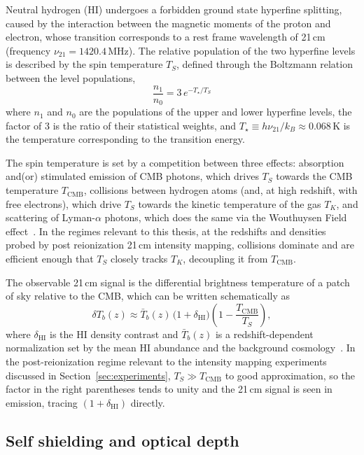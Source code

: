 Neutral hydrogen (HI) undergoes a forbidden ground state hyperfine splitting, caused by the interaction between the magnetic moments of the proton and electron, whose transition corresponds to a rest frame wavelength of 21\,cm (frequency $\nu_{21}=1420.4$\,MHz). The relative population of the two hyperfine levels is described by the spin temperature $T_S$, defined through the Boltzmann relation between the level populations,
\begin{equation}
    \frac{n_1}{n_0} = 3\,e^{-T_\star/T_S}
\end{equation}
where $n_1$ and $n_0$ are the populations of the upper and lower hyperfine levels, the factor of 3 is the ratio of their statistical weights, and $T_\star\equiv h\nu_{21}/k_B\approx0.068$\,K is the temperature corresponding to the transition energy.

The spin temperature is set by a competition between three effects: absorption and(or) stimulated emission of CMB photons, which drives $T_S$ towards the CMB temperature $T_\text{CMB}$, collisions between hydrogen atoms (and, at high redshift, with free electrons), which drive $T_S$ towards the kinetic temperature of the gas $T_K$, and scattering of Lyman-$\alpha$ photons, which does the same via the Wouthuysen Field effect~\citep{Furlanetto:2006}. In the regimes relevant to this thesis, at the redshifts and densities probed by post reionization 21\,cm intensity mapping, collisions dominate and are efficient enough that $T_S$ closely tracks $T_K$, decoupling it from $T_\text{CMB}$.

The observable 21\,cm signal is the differential brightness temperature of a patch of sky relative to the CMB, which can be written schematically as
\begin{equation}
    \delta T_b(z) \approx \bar{T}_b(z)\,\big(1+\delta_\text{HI}\big)\left(1 - \frac{T_\text{CMB}}{T_S}\right),
\end{equation}
where $\delta_\text{HI}$ is the HI density contrast and $\bar{T}_b(z)$ is a redshift-dependent normalization set by the mean HI abundance and the background cosmology~\citep{Furlanetto:2006}. In the post-reionization regime relevant to the intensity mapping experiments discussed in Section~\ref{sec:experiments}, $T_S\gg T_\text{CMB}$ to good approximation, so the factor in the right parentheses tends to unity and the 21\,cm signal is seen in emission, tracing $(1+\delta_\text{HI})$ directly.

\subsection{Self shielding and optical depth}

